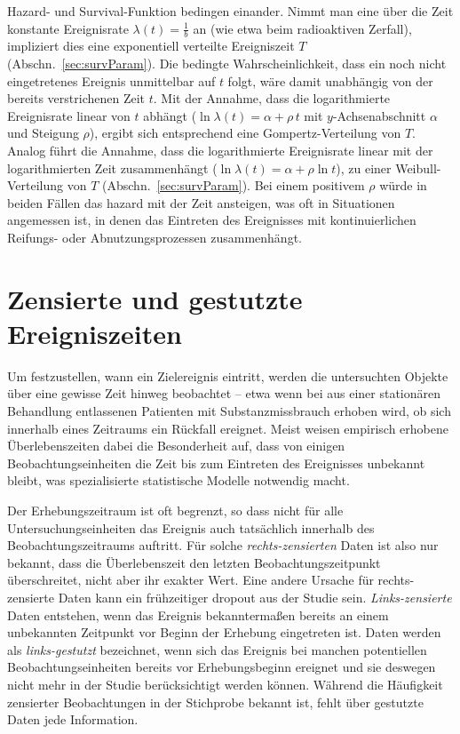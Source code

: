 Hazard- und Survival-Funktion bedingen einander. Nimmt man eine über die Zeit konstante Ereignisrate $\lambda(t) = \frac{1}{b}$ an (wie etwa beim radioaktiven Zerfall), impliziert dies eine exponentiell verteilte Ereigniszeit $T$ (Abschn.\ \ref{sec:survParam}). Die bedingte Wahrscheinlichkeit, dass ein noch nicht eingetretenes Ereignis unmittelbar auf $t$ folgt, wäre damit unabhängig von der bereits verstrichenen Zeit $t$. Mit der Annahme, dass die logarithmierte Ereignisrate linear von $t$ abhängt ($\ln \lambda(t) = \alpha + \rho \, t$ mit $y$-Achsenabschnitt $\alpha$ und Steigung $\rho$), ergibt sich entsprechend eine Gompertz-Verteilung von $T$. Analog führt die Annahme, dass die logarithmierte Ereignisrate linear mit der logarithmierten Zeit zusammenhängt ($\ln \lambda(t) = \alpha + \rho \ln t$), zu einer Weibull-Verteilung von $T$ (Abschn.\ \ref{sec:survParam}). Bei einem positivem $\rho$ würde in beiden Fällen das hazard mit der Zeit ansteigen, was oft in Situationen angemessen ist, in denen das Eintreten des Ereignisses mit kontinuierlichen Reifungs- oder Abnutzungsprozessen zusammenhängt.

\section{Zensierte und gestutzte Ereigniszeiten}
\label{sec:survData}

Um festzustellen, wann ein Zielereignis eintritt, werden die untersuchten Objekte über eine gewisse Zeit hinweg beobachtet -- etwa wenn bei aus einer stationären Behandlung entlassenen Patienten mit Substanzmissbrauch erhoben wird, ob sich innerhalb eines Zeitraums ein Rückfall ereignet. Meist weisen empirisch erhobene Überlebenszeiten dabei die Besonderheit auf, dass von einigen Beobachtungseinheiten die Zeit bis zum Eintreten des Ereignisses unbekannt bleibt, was spezialisierte statistische Modelle notwendig macht.

Der Erhebungszeitraum ist oft begrenzt, so dass nicht für alle Untersuchungseinheiten das Ereignis auch tatsächlich innerhalb des Beobachtungszeitraums auftritt. Für solche \emph{rechts-zensierten} Daten ist also nur bekannt, dass die Überlebenszeit den letzten Beobachtungszeitpunkt überschreitet, nicht aber ihr exakter Wert. Eine andere Ursache für rechts-zensierte Daten kann ein frühzeitiger dropout aus der Studie sein. \emph{Links-zensierte} Daten entstehen, wenn das Ereignis bekanntermaßen bereits an einem unbekannten Zeitpunkt vor Beginn der Erhebung eingetreten ist. Daten werden als \emph{links-gestutzt} bezeichnet, wenn sich das Ereignis bei manchen potentiellen Beobachtungseinheiten bereits vor Erhebungsbeginn ereignet und sie deswegen nicht mehr in der Studie berücksichtigt werden können. Während die Häufigkeit zensierter Beobachtungen in der Stichprobe bekannt ist, fehlt über gestutzte Daten jede Information.

